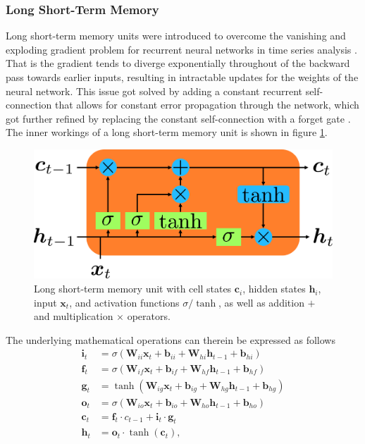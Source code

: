 \subsubsection{Long Short-Term Memory}
Long short-term memory units were introduced to overcome the vanishing and exploding gradient problem for recurrent neural networks in time series analysis \cite{hochreiter1997long}. That is the gradient tends to diverge exponentially throughout of the backward pass towards earlier inputs, resulting in intractable updates for the weights of the neural network. This issue got solved by adding a constant recurrent self-connection that allows for constant error propagation through the network, which got further refined by replacing the constant self-connection with a forget gate \cite{gers1999learning}. The inner workings of a long short-term memory unit is shown in figure \ref{fig::221_lstm}. 
\begin{figure}[h!]
	\centering
	\includegraphics[scale=.28]{chapters/02_background/img/lstm.png}
	\caption{Long short-term memory unit with cell states $\bm{c}_i$, hidden states $\bm{h}_i$, input $\bm{x}_t$, and activation functions $\sigma/\tanh$, as well as addition $+$ and multiplication $\times$ operators.}
	\label{fig::221_lstm}
\end{figure}
The underlying mathematical operations can therein be expressed as follows
\begin{align}
	\bm{i}_t &= \sigma(\bm{W}_{ii}\bm{x}_t+\bm{b}_{ii}+\bm{W}_{hi}\bm{h}_{t-1}+\bm{b}_{hi})\\
	\bm{f}_t &= \sigma(\bm{W}_{if}\bm{x}_t+\bm{b}_{if}+\bm{W}_{hf}\bm{h}_{t-1}+\bm{b}_{hf})\\
	\bm{g}_t &= \tanh(\bm{W}_{ig}\bm{x}_t+\bm{b}_{ig}+\bm{W}_{hg}\bm{h}_{t-1}+\bm{b}_{hg})\\
	\bm{o}_t &= \sigma(\bm{W}_{io}\bm{x}_t+\bm{b}_{io}+\bm{W}_{ho}\bm{h}_{t-1}+\bm{b}_{ho})\\
	\bm{c}_t &= \bm{f}_t\cdot c_{t-1} + \bm{i}_t\cdot\bm{g}_t\\
	\bm{h}_t &= \bm{o}_t \cdot\tanh(\bm{c}_t),
\end{align}
